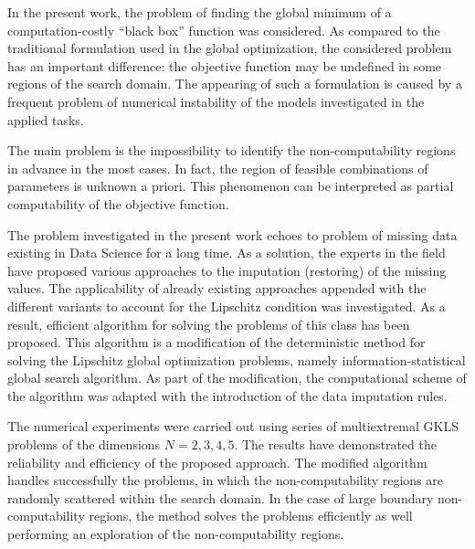 \documentclass[runningheads]{llncs}
\begin{document}
In the present work, the problem of finding the global minimum of a computation-costly ``black box'' function was considered. As compared to the traditional formulation used in the global optimization, the considered problem has an important difference: the objective function may be undefined in some regions of the search domain. The appearing of such a formulation is caused by a frequent problem of numerical instability of the models investigated in the applied tasks.

The main problem is the impossibility to identify the non-computability regions in advance in the most cases. In fact, the region of feasible combinations of parameters is unknown a priori. This phenomenon can be interpreted as partial computability of the objective function.

The problem investigated in the present work echoes to problem of missing data existing in Data Science for a long time. As a solution, the experts in the field have proposed various approaches to the imputation (restoring) of the missing values. %
The applicability of already existing approaches appended with the different variants to account for the Lipschitz condition was investigated. As a result, efficient algorithm for solving the problems of this class has been proposed. This algorithm is a modification of the deterministic method for solving the Lipschitz global optimization problems, namely information-statistical global search algorithm.
As part of the modification, the computational scheme of the algorithm was adapted with the introduction of the data imputation rules.

The numerical experiments were carried out using series of multiextremal GKLS problems of the dimensions $N = 2,3,4,5$. The results have demonstrated the reliability and efficiency of the proposed approach. The modified algorithm handles successfully the problems, in which the non-computability regions are randomly scattered within the search domain. In the case of large boundary non-computability regions, the method solves the problems efficiently as well performing an exploration of the non-computability regions.


%
%
%


\end{document}
